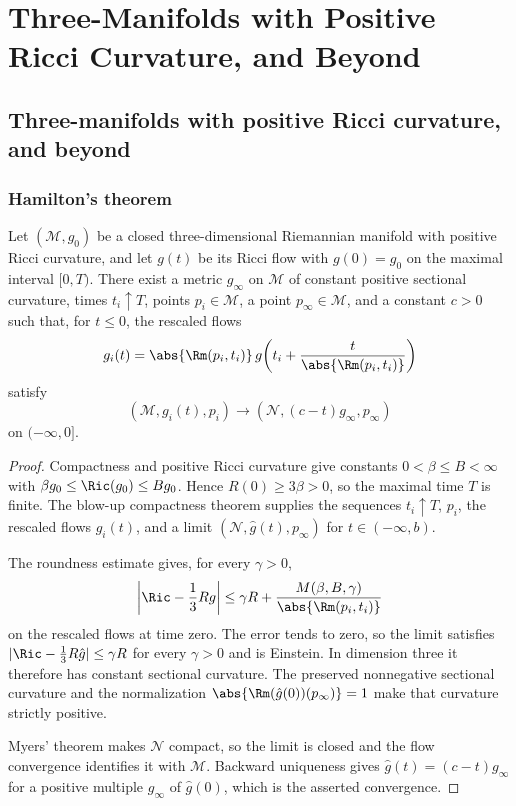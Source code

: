 \chapter{Three-Manifolds with Positive Ricci Curvature, and Beyond}

\section{Three-manifolds with positive Ricci curvature, and beyond}

\subsection{Hamilton's theorem}

\begin{theorem}
\label{topping-ch10-hamilton-theorem}
Let $(\mathcal{M},g_0)$ be a closed three-dimensional Riemannian manifold with
positive Ricci curvature, and let $g(t)$ be its Ricci flow with $g(0)=g_0$ on
the maximal interval $[0,T)$. There exist a metric $g_\infty$ on $\mathcal{M}$
of constant positive sectional curvature, times $t_i\uparrow T$, points
$p_i\in\mathcal{M}$, a point $p_\infty\in\mathcal{M}$, and a constant $c>0$
such that, for $t\leq 0$, the rescaled flows
\[
g_i(t)=\abs{\Rm(p_i,t_i)}\,g\!\left(t_i+
\frac{t}{\abs{\Rm(p_i,t_i)}}\right)
\]
satisfy
\[
(\mathcal{M},g_i(t),p_i)\longrightarrow
(\mathcal{N},(c-t)g_\infty,p_\infty)
\]
on $(-\infty,0]$.
\end{theorem}

\begin{proof}
\sketch Compactness and positive Ricci curvature give constants
$0<\beta\leq B<\infty$ with
$\beta g_0\leq\Ric(g_0)\leq Bg_0$. Hence $R(0)\geq3\beta>0$, so the
maximal time $T$ is finite. The blow-up compactness theorem supplies the
sequences $t_i\uparrow T$, $p_i$, the rescaled flows $g_i(t)$, and a limit
$(\mathcal{N},\hat g(t),p_\infty)$ for $t\in(-\infty,b)$.

The roundness estimate gives, for every $\gamma>0$,
\[
\left|\Ric-\frac13Rg\right|\leq\gamma R+
\frac{M(\beta,B,\gamma)}{\abs{\Rm(p_i,t_i)}}
\]
on the rescaled flows at time zero. The error tends to zero, so the limit
satisfies $|\Ric-\frac13R\hat g|\leq\gamma R$ for every $\gamma>0$ and is
Einstein. In dimension three it therefore has constant sectional curvature.
The preserved nonnegative sectional curvature and the normalization
$\abs{\Rm(\hat g(0))(p_\infty)}=1$ make that curvature strictly positive.

Myers' theorem makes $\mathcal{N}$ compact, so the limit is closed and the
flow convergence identifies it with $\mathcal{M}$. Backward uniqueness gives
$\hat g(t)=(c-t)g_\infty$ for a positive multiple $g_\infty$ of $\hat g(0)$,
which is the asserted convergence.
\end{proof}

